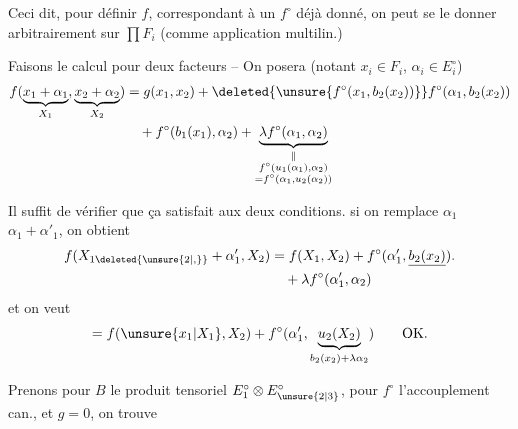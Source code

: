 Ceci dit, pour définir  $f$,  correspondant à un $f^\circ$ déjà donné, on peut se le donner arbitrairement  sur $\prod F_i$ (comme application multilin.)


Faisons le calcul pour deux facteurs -- On posera (notant $x_i\in F_i$, $\alpha_i\in E_i^\circ$)
\[
\begin{aligned}
 f(\underbrace{x_1+\alpha_1}_{X_1},\underbrace{x_2+\alpha_2}_{X_2})
 &=g(x_1,x_2)+\deleted{\unsure{f^\circ(x_1,b_2(x_2))}}f^\circ(\alpha_1,b_2(x_2))\\
 &\quad+f^\circ(b_1(x_1),\alpha_2)+
 \underbrace{\lambda f^\circ(\alpha_1,\alpha_2)}_{\substack{\Vert\\f^\circ(u_1(\alpha_1),\alpha_2)\\=f^\circ(\alpha_1,u_2(\alpha_2))}}
\end{aligned}
\]

Il suffit de vérifier que ça satisfait aux deux conditions.  si on remplace $\alpha_1$  $\alpha_1+\alpha'_1$, on obtient
\[
\begin{aligned}
f(X_{1\deleted{\unsure{2|,}}}+\alpha'_1,X_2)&=f(X_1,X_2)+f^\circ(\alpha'_1,\underline{b_2(x_2)}).\\
&\quad+\lambda f^\circ(\alpha'_1,\alpha_2)
\end{aligned}
\]
et on veut
\[
 = f(\unsure{x_1|X_1},X_2)+f^\circ(\alpha'_1,\underbrace{u_2(X_2)}_{b_2(x_2)+\lambda\alpha_2})\qquad \text{OK.}
\]

Prenons pour $B$ le produit tensoriel $E_1^\circ\otimes E_{\unsure{2|3}}^\circ$, pour $f^\circ$ l'accouplement can., et $g=0$, on trouve
